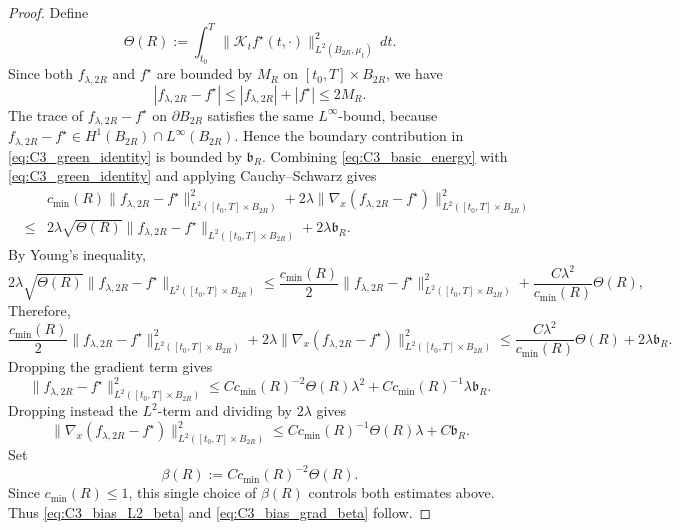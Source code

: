 \documentclass[11pt]{article}
\theoremstyle{plain}
\theoremstyle{definition}
\theoremstyle{remark}
\begin{document}
\begin{proof}
Define
\[
\Theta(R):=
\int_{t_0}^T
\|\mathcal K_t f^\star(t,\cdot)\|_{L^2(B_{2R},\mu_t)}^2\,dt.
\]
Since both \(f_{\lambda,2R}\) and \(f^\star\) are bounded by \(M_R\) on
\([t_0,T]\times B_{2R}\), we have
\[
|f_{\lambda,2R}-f^\star|
\le
|f_{\lambda,2R}|+|f^\star|
\le
2M_R.
\]
The trace of \(f_{\lambda,2R}-f^\star\) on \(\partial B_{2R}\) satisfies the same
\(L^\infty\)-bound, because \(f_{\lambda,2R}-f^\star\in H^1(B_{2R})\cap
L^\infty(B_{2R})\). Hence the boundary contribution in
\eqref{eq:C3_green_identity} is bounded by \(\mathfrak b_R\). Combining
\eqref{eq:C3_basic_energy} with \eqref{eq:C3_green_identity} and applying
Cauchy--Schwarz gives
\begin{eqnarray}
\label{eq:C3_energy_with_boundary}
&&c_{\min}(R)\|f_{\lambda,2R}-f^\star\|_{L^2([t_0,T]\times B_{2R})}^2
+
2\lambda\|\nabla_x(f_{\lambda,2R}-f^\star)\|_{L^2([t_0,T]\times B_{2R})}^2\nonumber\\
&\le&
2\lambda\sqrt{\Theta(R)}
\|f_{\lambda,2R}-f^\star\|_{L^2([t_0,T]\times B_{2R})}
+
2\lambda\mathfrak b_R.
\end{eqnarray}
By Young's inequality,
\[
2\lambda\sqrt{\Theta(R)}
\|f_{\lambda,2R}-f^\star\|_{L^2([t_0,T]\times B_{2R})}
\le
\frac{c_{\min}(R)}{2}
\|f_{\lambda,2R}-f^\star\|_{L^2([t_0,T]\times B_{2R})}^2
+
\frac{C\lambda^2}{c_{\min}(R)}\Theta(R),
\]
Therefore,
\[
\frac{c_{\min}(R)}{2}
\|f_{\lambda,2R}-f^\star\|_{L^2([t_0,T]\times B_{2R})}^2
+
2\lambda\|\nabla_x(f_{\lambda,2R}-f^\star)\|_{L^2([t_0,T]\times B_{2R})}^2
\le
\frac{C\lambda^2}{c_{\min}(R)}\Theta(R)
+
2\lambda\mathfrak b_R.
\]
Dropping the gradient term gives
\[
\|f_{\lambda,2R}-f^\star\|_{L^2([t_0,T]\times B_{2R})}^2
\le
C c_{\min}(R)^{-2}\Theta(R)\lambda^2
+
C c_{\min}(R)^{-1}\lambda\mathfrak b_R.
\]
Dropping instead the \(L^2\)-term and dividing by \(2\lambda\) gives
\[
\|\nabla_x(f_{\lambda,2R}-f^\star)\|_{L^2([t_0,T]\times B_{2R})}^2
\le
C c_{\min}(R)^{-1}\Theta(R)\lambda
+
C\mathfrak b_R.
\]
Set
\[
\beta(R):=
C c_{\min}(R)^{-2}\Theta(R).
\]
Since \(c_{\min}(R)\le 1\), this single
choice of \(\beta(R)\) controls both estimates above. Thus
\eqref{eq:C3_bias_L2_beta} and \eqref{eq:C3_bias_grad_beta} follow.


\end{proof}
\end{document}
